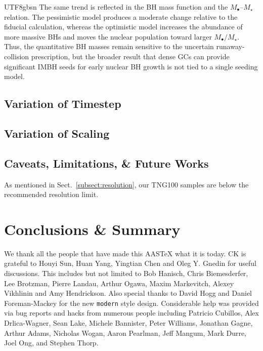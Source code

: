 \documentclass[trackchanges, twocolappendix, twocolumn]{aastex701}
\begin{document}
\begin{CJK*}{UTF8}{gbsn}
The same trend is reflected in the BH mass function and the $M_\bullet$--$M_\star$ relation. The pessimistic model produces a moderate change relative to the fiducial calculation, whereas the optimistic model increases the abundance of more massive BHs and moves the nuclear population toward larger $M_\bullet/M_\star$. Thus, the quantitative BH masses remain sensitive to the uncertain runaway-collision prescription, but the broader result that dense GCs can provide significant IMBH seeds for early nuclear BH growth is not tied to a single seeding model.

\subsection{Variation of Timestep} \label{subsect:timestep}

\subsection{Variation of Scaling} \label{subsect:f_h}

\subsection{Caveats, Limitations, \& Future Works} \label{subsect:limit}

As mentioned in Sect.~\ref{subsect:resolution}, our TNG100 samples are below the recommended resolution limit.

\section{Conclusions \& Summary} \label{sect:summary}

\begin{acknowledgments}
We thank all the people that have made this AASTeX what it is today. CK is grateful to Houyi Sun, Huan Yang, Yingtian Chen and Oleg Y. Gnedin for useful discussions. This
includes but not limited to Bob Hanisch, Chris Biemesderfer, Lee Brotzman,
Pierre Landau, Arthur Ogawa, Maxim Markevitch, Alexey Vikhlinin and Amy
Hendrickson. Also special thanks to David Hogg and Daniel Foreman-Mackey
for the new {\tt\string modern} style design. Considerable help was provided via bug
reports and hacks from numerous people including Patricio Cubillos, Alex
Drlica-Wagner, Sean Lake, Michele Bannister, Peter Williams, Jonathan
Gagne, Arthur Adams, Nicholas Wogan, Aaron Pearlman, Jeff Mangum, Mark Durre, Joel Ong, and Stephen Thorp.
\end{acknowledgments}


\end{CJK*}
\end{document}
